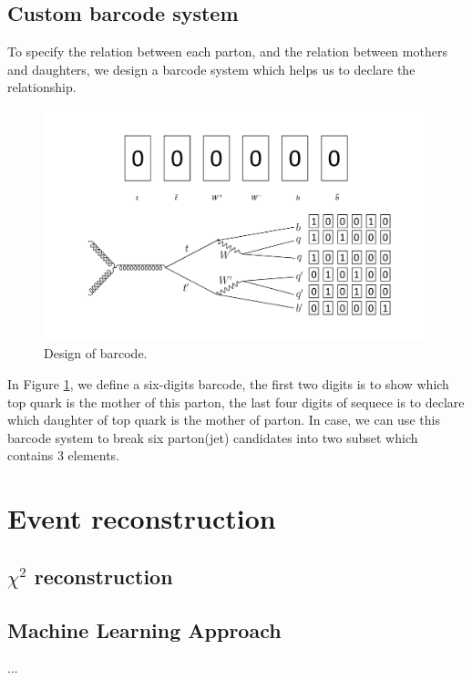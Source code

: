 \subsection{Custom barcode system}\label{subsec:barcode}
To specify the relation between each parton, and the relation between mothers and daughters, we design a barcode system which helps us to declare the relationship.

\begin{figure}[h!]
	\includegraphics[width=0.8\linewidth]{Figures/barcode.pdf}
	\caption{Design of barcode.}
	\label{fig:barcode}
\end{figure}

In Figure \ref{fig:barcode}, we define a six-digits barcode, the first two digits is to show which top quark is the mother of this parton, the last four digits of sequece is to declare which daughter of top quark is the mother of parton. In case, we can use this barcode system to break six parton(jet) candidates into two subset which contains 3 elements. 

\section{Event reconstruction}\label{sec:Event reconstruction}

\subsection{$\chi^{2}$ reconstruction}\label{subsec:chi-square}

\subsection{Machine Learning Approach}\label{subsec:ML approach}


...

